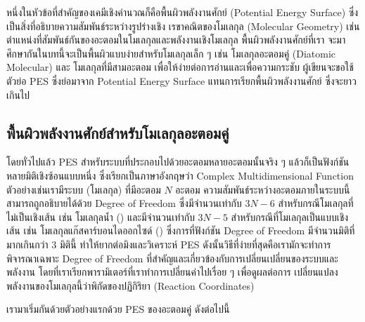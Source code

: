 หนึ่งในหัวข้อที่สำคัญของเคมีเชิงคำนวณก็คือพื้นผิวพลังงานศักย์ (Potential Energy Surface) ซึ่งเป็นสิ่งที่อธิบายความสัมพันธ์ระหว่างรูปร่างเชิง%
เรขาคณิตของโมเลกุล (Molecular Geometry) เช่น ตำแหน่งที่สัมพันธ์กันของอะตอมในโมเลกุลและพลังงานเชิงโมเลกุล พื้นผิวพลังงานศักย์ที่เรา%
จะมาศึกษากันในบทนี้จะเป็นพื้นผิวแบบง่ายสำหรับโมเลกุลเล็ก ๆ เช่น โมเลกุลอะตอมคู่ (Diatomic Molecular) และ โมเลกุลที่มีสามอะตอม 
เพื่อให้ง่ายต่อการอ่านและเพื่อความกระชับ ผู้เขียนจะขอใช้ตัวย่อ PES ซึ่งย่อมาจาก Potential Energy Surface แทนการเรียกพื้นผิวพลังงานศักย์%
ซึ่งจะยาวเกินไป

\subsection{พื้นผิวพลังงานศักย์สำหรับโมเลกุลอะตอมคู่}
\label{ssec:pef_di_atomic}

โดยทั่วไปแล้ว PES สำหรับระบบที่ประกอบไปด้วยอะตอมหลายอะตอมนั้นจริง ๆ แล้วก็เป็นฟังก์ชันหลายมิติเชิงซ้อนแบบหนึ่ง ซึ่งเรียกเป็นภาษาอังกฤษว่า
Complex Multidimensional Function ตัวอย่างเช่นเรามีระบบ (โมเลกุล) ที่มีอะตอม $N$ อะตอม ความสัมพันธ์ระหว่างอะตอมภายในระบบนี้%
สามารถถูกอธิบายได้ด้วย Degree of Freedom ซึ่งมีจำนวนเท่ากับ $3N-6$ สำหรับกรณีโมเลกุลที่ไม่เป็นเชิงเส้น เช่น โมเลกุลน้ำ () 
และมีจำนวนเท่ากับ $3N-5$ สำหรับกรณีที่โมเลกุลเป็นแบบเชิงเส้น เช่น โมเลกุลแก๊สคาร์บอนไดออกไซด์ () ซึ่งการที่ฟังก์ชัน Degree 
of Freedom มีจำนวนมิติที่มากเกินกว่า 3 มิตินี้ ทำให้ยากต่อมิงและวิเคราะห์ PES ดังนั้นวิธีที่ง่ายที่สุดคือเรามักจะทำการพิจารณาเฉพาะ Degree of 
Freedom ที่สำคัญและเกี่ยวข้องกับการเปลี่ยนเปลี่ยนของระบบและพลังงาน โดยที่เราเรียกพารามิเตอร์ที่เราทำการเปลี่ยนค่าไปเรื่อย ๆ เพื่อดูผลต่อการ%
เปลี่ยนแปลงพลังงานของโมเลกุลนี้ว่าพิกัดของปฏิกิริยา (Reaction Coordinates) 

เรามาเริ่มกันด้วยตัวอย่างแรกด้วย PES ของอะตอมคู่ ดังต่อไปนี้

